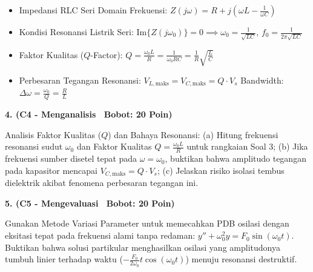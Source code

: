 \documentclass[10pt,a4paper]{article}
\begin{document}
\vfill

\begin{tcolorbox}[colback=unibblue!3,colframe=unibblue,colbacktitle=unibblue,coltitle=white,boxrule=0.6pt,arc=2pt,left=6pt,right=6pt,top=3pt,bottom=3pt,title=\textbf{\scriptsize FORMULA RUJUKAN TEKNIS \& STANDAR INDUSTRI TERKAIT}]
  \scriptsize
  \begin{itemize}[leftmargin=*, nosep]
  \item Impedansi RLC Seri Domain Frekuensi: $Z(j\omega) = R + j\left(\omega L - \frac{1}{\omega C}\right)$
  \item Kondisi Resonansi Listrik Seri: $\text{Im}\{Z(j\omega_0)\} = 0 \implies \omega_0 = \frac{1}{\sqrt{LC}}$, $f_0 = \frac{1}{2\pi\sqrt{LC}}$
  \item Faktor Kualitas ($Q$-Factor): $Q = \frac{\omega_0 L}{R} = \frac{1}{\omega_0 R C} = \frac{1}{R}\sqrt{\frac{L}{C}}$
  \item Perbesaran Tegangan Resonansi: $V_{L,\text{maks}} = V_{C,\text{maks}} = Q \cdot V_s$ \quad\textbar\quad Bandwidth: $\Delta\omega = \frac{\omega_0}{Q} = \frac{R}{L}$
\end{itemize}
\end{tcolorbox}

\newpage

\par
\vspace{1mm}

\noindent\textbf{4. (C4 - Menganalisis \textbar\ Bobot: 20 Poin)}\par\vspace{0.8mm}
{\footnotesize Analisis Faktor Kualitas ($Q$) dan Bahaya Resonansi: (a) Hitung frekuensi resonansi sudut $\omega_0$ dan Faktor Kualitas $Q = \frac{\omega_0 L}{R}$ untuk rangkaian Soal 3; (b) Jika frekuensi sumber disetel tepat pada $\omega = \omega_0$, buktikan bahwa amplitudo tegangan pada kapasitor mencapai $V_{C,\text{maks}} = Q \cdot V_s$; (c) Jelaskan risiko isolasi tembus dielektrik akibat fenomena perbesaran tegangan ini.}\par

\vspace{3.5mm}

\noindent\textbf{5. (C5 - Mengevaluasi \textbar\ Bobot: 20 Poin)}\par\vspace{0.8mm}
{\footnotesize Gunakan Metode Variasi Parameter untuk memecahkan PDB osilasi dengan eksitasi tepat pada frekuensi alami tanpa redaman: $y'' + \omega_0^2 y = F_0 \sin(\omega_0 t)$. Buktikan bahwa solusi partikular menghasilkan osilasi yang amplitudonya tumbuh linier terhadap waktu ($-\frac{F_0}{2\omega_0} t \cos(\omega_0 t)$) menuju resonansi destruktif.}\par
\end{document}
